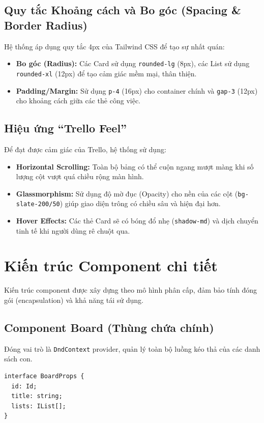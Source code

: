 \subsection{Quy tắc Khoảng cách và Bo góc (Spacing \& Border Radius)}
Hệ thống áp dụng quy tắc 4px của Tailwind CSS để tạo sự nhất quán:
\begin{itemize}
    \item \textbf{Bo góc (Radius):} Các Card sử dụng \texttt{rounded-lg} (8px), các List sử dụng \texttt{rounded-xl} (12px) để tạo cảm giác mềm mại, thân thiện.
    \item \textbf{Padding/Margin:} Sử dụng \texttt{p-4} (16px) cho container chính và \texttt{gap-3} (12px) cho khoảng cách giữa các thẻ công việc.
\end{itemize}

\subsection{Hiệu ứng ``Trello Feel''}
Để đạt được cảm giác của Trello, hệ thống sử dụng:
\begin{itemize}
    \item \textbf{Horizontal Scrolling:} Toàn bộ bảng có thể cuộn ngang mượt màng khi số lượng cột vượt quá chiều rộng màn hình.
    \item \textbf{Glassmorphism:} Sử dụng độ mờ đục (Opacity) cho nền của các cột (\texttt{bg-slate-200/50}) giúp giao diện trông có chiều sâu và hiện đại hơn.
    \item \textbf{Hover Effects:} Các thẻ Card sẽ có bóng đổ nhẹ (\texttt{shadow-md}) và dịch chuyển tinh tế khi người dùng rê chuột qua.
\end{itemize}

\section{Kiến trúc Component chi tiết}

Kiến trúc component được xây dựng theo mô hình phân cấp, đảm bảo tính đóng gói (encapsulation) và khả năng tái sử dụng.

\subsection{Component Board (Thùng chứa chính)}
Đóng vai trò là \texttt{DndContext} provider, quản lý toàn bộ luồng kéo thả của các danh sách con.
\begin{Verbatim}
interface BoardProps {
  id: Id;
  title: string;
  lists: IList[];
}
\end{Verbatim}

